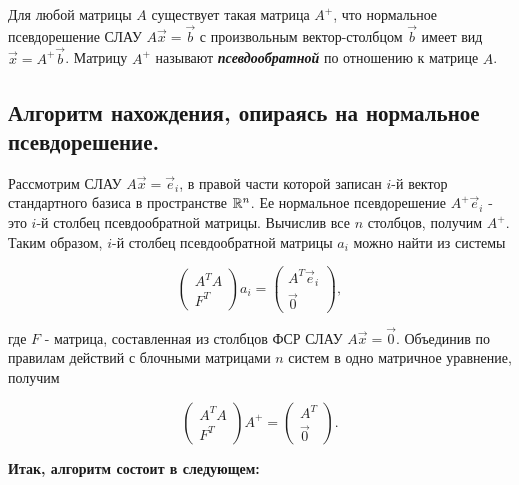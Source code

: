 \begin{definition}
    Для любой матрицы $A$ существует такая матрица $A^+$, что нормальное псевдорешение СЛАУ $A\vec{x} = \vec{b}$ с произвольным вектор-столбцом $\vec{b}$ имеет вид $\vec{x} = A^+\vec{b}$. Матрицу $A^+$ называют \textit{\textbf{псевдообратной}} по отношению к матрице $A$.
\end{definition}

\subsection{
    Алгоритм нахождения, опираясь на нормальное псевдорешение.
}

Рассмотрим СЛАУ $A\vec{x} = \vec{e}_i$, в правой части которой записан $i$-й вектор стандартного базиса в пространстве $\mathbb{R}^n$. Ее нормальное псевдорешение $A^+\vec{e}_i$ - это $i$-й столбец псевдообратной матрицы. Вычислив все $n$ столбцов, получим $A^+$. Таким образом, $i$-й столбец псевдообратной матрицы $a_i$ можно найти из системы

\begin{equation*}
    \left(\begin{array}{c}
        A^TA \\
        F^T
    \end{array}\right)a_i
    =
    \left(\begin{array}{c}
        A^T\vec{e}_i \\
        \vec{0}
    \end{array}\right)
,\end{equation*}

где $F$ - матрица, составленная из столбцов ФСР СЛАУ $A\vec{x} = \vec{0}$. Объединив по правилам действий с блочными матрицами $n$ систем в одно матричное уравнение, получим

\begin{equation*}
    \left(\begin{array}{c}
        A^TA \\
        F^T
    \end{array}\right)A^+
    =
    \left(\begin{array}{c}
        A^T \\
        \vec{0}
    \end{array}\right)
.\end{equation*}

\textbf{Итак, алгоритм состоит в следующем:}

